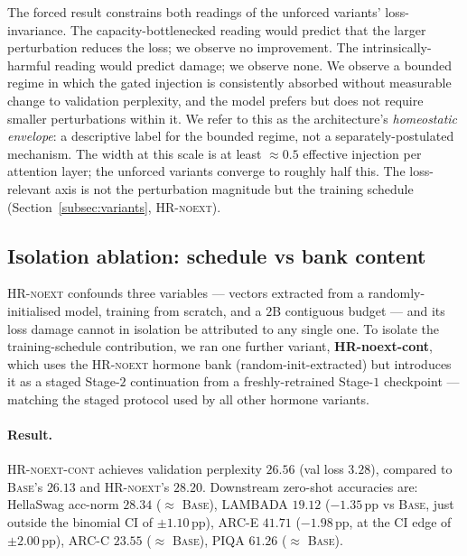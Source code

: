 The forced result constrains both readings of the unforced variants' loss-invariance. The capacity-bottlenecked reading would predict that the larger perturbation reduces the loss; we observe no improvement. The intrinsically-harmful reading would predict damage; we observe none. We observe a bounded regime in which the gated injection is consistently absorbed without measurable change to validation perplexity, and the model prefers but does not require smaller perturbations within it. We refer to this as the architecture's \emph{homeostatic envelope}: a descriptive label for the bounded regime, not a separately-postulated mechanism. The width at this scale is at least $\approx 0.5$ effective injection per attention layer; the unforced variants converge to roughly half this. The loss-relevant axis is not the perturbation magnitude but the training schedule (Section~\ref{subsec:variants}, \textsc{HR-noext}).

\subsection{Isolation ablation: schedule vs bank content}
\label{subsec:noext-cont}

\textsc{HR-noext} confounds three variables --- vectors extracted from a randomly-initialised model, training from scratch, and a $2$B contiguous budget --- and its loss damage cannot in isolation be attributed to any single one. To isolate the training-schedule contribution, we ran one further variant, \textbf{HR-noext-cont}, which uses the \textsc{HR-noext} hormone bank (random-init-extracted) but introduces it as a staged Stage-$2$ continuation from a freshly-retrained Stage-$1$ checkpoint --- matching the staged protocol used by all other hormone variants.

\paragraph{Result.} \textsc{HR-noext-cont} achieves validation perplexity $\mathbf{26.56}$ (val loss $3.28$), compared to \textsc{Base}'s $26.13$ and \textsc{HR-noext}'s $28.20$. Downstream zero-shot accuracies are: HellaSwag acc-norm $28.34$ ($\approx$ \textsc{Base}), LAMBADA $19.12$ ($-1.35$\,pp vs \textsc{Base}, just outside the binomial CI of $\pm 1.10$\,pp), ARC-E $41.71$ ($-1.98$\,pp, at the CI edge of $\pm 2.00$\,pp), ARC-C $23.55$ ($\approx$ \textsc{Base}), PIQA $61.26$ ($\approx$ \textsc{Base}).

